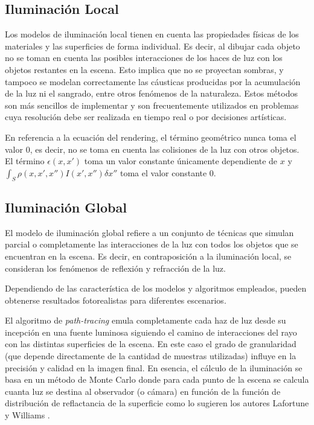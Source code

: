 \subsection{Iluminación Local}
\label{sec:ilumlocal}
Los modelos de iluminación local tienen en cuenta las propiedades físicas de los materiales
y las superficies de forma individual. Es decir, al dibujar cada objeto no se toman en cuenta las posibles interacciones de los haces de luz con los objetos restantes en la escena. Esto implica que no se proyectan sombras, y tampoco se modelan correctamente las cáusticas producidas por la acumulación de la luz ni el sangrado, entre otros fenómenos de la naturaleza. Estos métodos son más sencillos de implementar y son frecuentemente utilizados en problemas cuya resolución debe ser realizada en tiempo real o por decisiones artísticas.

En referencia a la ecuación del rendering, el término geométrico nunca toma el valor 0, es decir, no se toma en cuenta las colisiones de la luz con otros objetos. El término $\epsilon(x,x')$ toma un valor constante únicamente dependiente de $x$ y $\int_{S} \rho(x,x',x'')I(x',x'') \delta x''$ toma el valor constante $0$.

\subsection{Iluminación Global}
\label{sec:ilumglobal}

El modelo de iluminación global refiere a un conjunto de técnicas que simulan parcial o completamente las interacciones de la luz con todos los objetos que se encuentran  en la escena. Es decir, en contraposición a la iluminación local, se consideran los fenómenos de reflexión y refracción de la luz.

Dependiendo de las característica de los modelos y algoritmos empleados, pueden obtenerse resultados fotorealistas para diferentes escenarios.

El algoritmo de \textit{path-tracing} emula completamente cada haz de luz desde su incepción en una fuente luminosa siguiendo el camino de interacciones del rayo con las distintas superficies de la escena. En este caso el grado de granularidad (que depende directamente de la cantidad de muestras utilizadas) influye en la precisión y calidad en la imagen final. En esencia, el cálculo de la iluminación se basa en un método de Monte Carlo donde para cada punto de la escena se calcula cuanta luz se destina al observador (o cámara) en función de la función de distribución de reflactancia de la superficie como lo sugieren los autores Lafortune y Williams \cite{LW1993BPT}.

